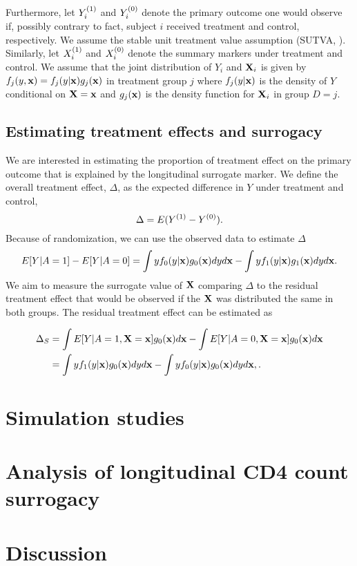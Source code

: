 \documentclass[useAMS,usenatbib,referee]{biom}
\begin{document}
Furthermore, let \(Y_i^{(1)}\) and \(Y_i^{(0)}\) denote the primary
outcome one would observe if, possibly contrary to fact, subject \(i\)
received treatment and control, respectively. We assume the stable unit
treatment value assumption (SUTVA, \citet{rosenbaum1983central}).
Similarly, let \(X_i^{(1)}\) and \(X_i^{(0)}\) denote the summary markers
under treatment and control. We assume that the joint distribution of
\(Y_i\) and \({\bf X}_i\) is given by \(f_j(y, {\bf x}) = f_j(y|{\bf x})g_j({\bf x})\)
in treatment group \(j\) where \(f_j(y|{\bf x})\) is the density of \(Y\)
conditional on \({\bf X} = {\bf x}\) and \(g_j({\bf x})\) is the density function
for \({\bf X}_i\) in group \(D = j\).

\subsection{Estimating treatment effects and
surrogacy}\label{estimating-treatment-effects-and-surrogacy}

We are interested in estimating the proportion of treatment effect on
the primary outcome that is explained by the longitudinal surrogate
marker. We define the overall treatment effect, \(\Delta\), as the
expected difference in \(Y\) under treatment and control,
\[\Delta=E(Y^{(1)}-Y^{(0)}).\] Because of randomization, we can use the
observed data to estimate \(\Delta\)
\[E[Y | A = 1] - E[Y | A = 0] = \int y f_0(y|{\bf x})g_0({\bf x})dyd{\bf x} - \int y f_1(y|{\bf x})g_1({\bf x})dyd{\bf x}.\]
We aim to measure the surrogate value of \({\bf X}\) comparing \(\Delta\) to
the residual treatment effect that would be observed if the \({\bf X}\) was
distributed the same in both groups. The residual treatment effect can
be estimated as

\begin{align*}
\Delta_S &= \int E[Y | A = 1, \bX = \bx]g_0(\bx)d\bx - \int E[Y | A = 0, \bX = \bx]g_0(\bx)d\bx \\
&= \int y f_1(y|\bx)g_0(\bx)dyd\bx - \int y f_0(y|\bx)g_0(\bx)dyd\bx, \label{residual_effect}.
\end{align*}

\section{Simulation studies}\label{sec:2}

\section{Analysis of longitudinal CD4 count
surrogacy}\label{analysis-of-longitudinal-cd4-count-surrogacy}

\section{Discussion}\label{discussion}






\label{lastpage}
\end{document}
